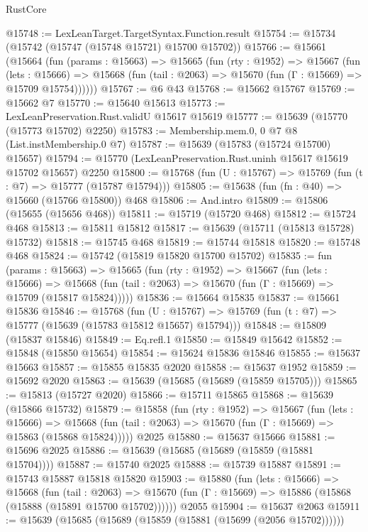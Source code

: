 \begin{lexlean}{RustCore}
\begin{coremodule}
@15748 := LexLeanTarget.TargetSyntax.Function.result
@15754 := @15734 (@15742 (@15747 (@15748 @15721) @15700 @15702))
@15766 := @15661
    (@15664
      (fun (params : @15663) =>
      @15665
        (fun (rty : @1952) =>
        @15667
          (fun (lets : @15666) =>
          @15668 (fun (tail : @2063) => @15670 (fun (Γ : @15669) => @15709 @15754))))))
@15767 := @6 @43
@15768 := @15662 @15767
@15769 := @15662 @7
@15770 := @15640 @15613
@15773 := LexLeanPreservation.Rust.validU @15617 @15619
@15777 := @15639 (@15770 (@15773 @15702) @2250)
@15783 := Membership.mem.{0, 0} @7 @8 (List.instMembership.{0} @7)
@15787 := @15639 (@15783 (@15724 @15700) @15657)
@15794 := @15770 (LexLeanPreservation.Rust.uninh @15617 @15619 @15702 @15657) @2250
@15800 := @15768 (fun (U : @15767) => @15769 (fun (t : @7) => @15777 (@15787 @15794)))
@15805 := @15638 (fun (fn : @40) => @15660 (@15766 @15800)) @468
@15806 := And.intro
@15809 := @15806 (@15655 (@15656 @468))
@15811 := @15719 (@15720 @468)
@15812 := @15724 @468
@15813 := @15811 @15812
@15817 := @15639 (@15711 (@15813 @15728) @15732)
@15818 := @15745 @468
@15819 := @15744 @15818
@15820 := @15748 @468
@15824 := @15742 (@15819 @15820 @15700 @15702)
@15835 := fun (params : @15663) =>
  @15665
    (fun (rty : @1952) =>
    @15667
      (fun (lets : @15666) =>
      @15668 (fun (tail : @2063) => @15670 (fun (Γ : @15669) => @15709 (@15817 @15824)))))
@15836 := @15664 @15835
@15837 := @15661 @15836
@15846 := @15768
    (fun (U : @15767) => @15769 (fun (t : @7) => @15777 (@15639 (@15783 @15812 @15657) @15794)))
@15848 := @15809 (@15837 @15846)
@15849 := Eq.refl.{1}
@15850 := @15849 @15642
@15852 := @15848 (@15850 @15654)
@15854 := @15624 @15836 @15846
@15855 := @15637 @15663
@15857 := @15855 @15835 @2020
@15858 := @15637 @1952
@15859 := @15692 @2020
@15863 := @15639 (@15685 (@15689 (@15859 @15705)))
@15865 := @15813 (@15727 @2020)
@15866 := @15711 @15865
@15868 := @15639 (@15866 @15732)
@15879 := @15858
    (fun (rty : @1952) =>
    @15667
      (fun (lets : @15666) =>
      @15668 (fun (tail : @2063) => @15670 (fun (Γ : @15669) => @15863 (@15868 @15824)))))
    @2025
@15880 := @15637 @15666
@15881 := @15696 @2025
@15886 := @15639 (@15685 (@15689 (@15859 (@15881 @15704))))
@15887 := @15740 @2025
@15888 := @15739 @15887
@15891 := @15743 @15887 @15818 @15820
@15903 := @15880
    (fun (lets : @15666) =>
    @15668
      (fun (tail : @2063) =>
      @15670 (fun (Γ : @15669) => @15886 (@15868 (@15888 (@15891 @15700 @15702))))))
    @2055
@15904 := @15637 @2063
@15911 := @15639 (@15685 (@15689 (@15859 (@15881 (@15699 (@2056 @15702))))))

\end{coremodule}
\end{lexlean}
